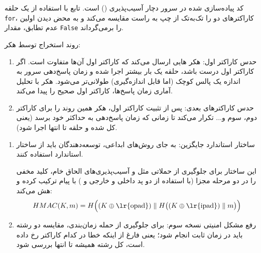 کد پیاده‌سازی شده در سرور دچار آسیب‌پذیری {()} است. تابع با استفاده از یک حلقه \texttt{for}، کاراکترهای دو  را تک‌به‌تک از چپ به راست مقایسه می‌کند و به محض دیدن اولین عدم تطابق، مقدار \texttt{False} را برمی‌گرداند.

{روند استخراج  توسط هکر:}
\begin{enumerate}
    \item {حدس کاراکتر اول:} هکر ‌هایی ارسال می‌کند که کاراکتر اول آن‌ها متفاوت است. اگر کاراکتر اول درست باشد، حلقه یک بار بیشتر اجرا شده و زمان پاسخ‌دهی سرور به اندازه یک پالس کوچک (اما قابل اندازه‌گیری) طولانی‌تر می‌شود. هکر با تحلیل آماری زمان پاسخ‌ها، کاراکتر اول  صحیح را پیدا می‌کند.
    \item {حدس کاراکترهای بعدی:} پس از تثبیت کاراکتر اول، هکر همین روند را برای کاراکتر دوم، سوم و... تکرار می‌کند تا زمانی که زمان پاسخ‌دهی به حداکثر خود برسد (یعنی کل  شده و حلقه تا انتها اجرا شود).
\end{enumerate}



\begin{enumerate}
    \item {ساختار استاندارد جایگزین:} به جای روش‌های ابداعی، توسعه‌دهندگان باید از ساختار استاندارد {} استفاده کنند.
    
    این ساختار برای جلوگیری از حملاتی مثل  و آسیب‌پذیری‌های الحاق خام، کلید مخفی را در دو مرحله مجزا (با استفاده از دو پد داخلی و خارجی \texttt{} و \texttt{}) با پیام ترکیب کرده و هش می‌کند:
    $$HMAC(K, m) = H\Big( (K \oplus \text{\lr{opad}}) \parallel H\big((K \oplus \text{\lr{ipad}}) \parallel m\big) \Big)$$

    \item {رفع مشکل امنیتی نسخه سوم:} برای جلوگیری از حمله زمان‌بندی، مقایسه دو رشته باید در {زمان ثابت} انجام شود؛ یعنی فارغ از اینکه خطا در کدام کاراکتر رخ داده است، کل رشته همیشه تا انتها بررسی شود.
\end{enumerate}
